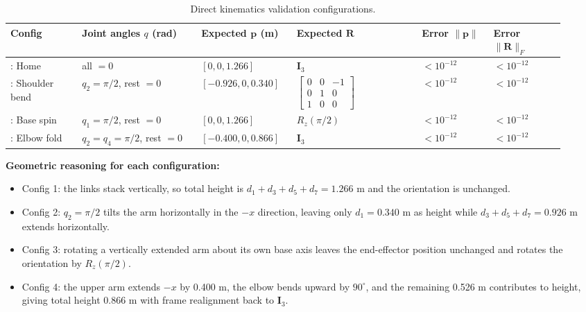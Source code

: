 \documentclass[11pt,a4paper]{article}
\newcommand{\R}{\mathbf{R}}
\newcommand{\I}{\mathbf{I}}
\newcommand{\pvec}{\mathbf{p}}
\begin{document}
\begin{table}[H]
  \centering
  \caption{Direct kinematics validation configurations.}
  \renewcommand{\arraystretch}{1.15}
  \begin{tabularx}{\linewidth}{>{\raggedright\arraybackslash}p{0.12\linewidth} >{\raggedright\arraybackslash}p{0.20\linewidth} >{\raggedright\arraybackslash}p{0.16\linewidth} >{\raggedright\arraybackslash}p{0.21\linewidth} >{\raggedright\arraybackslash}p{0.12\linewidth} >{\raggedright\arraybackslash}p{0.12\linewidth}}
    \toprule
    Config & Joint angles $q$ (rad) & Expected $\pvec$ (m) & Expected $\R$ & Error $\|\pvec\|$ & Error $\|\R\|_F$ \\
    \midrule
    1: Home & all $= 0$ & $[0, 0, 1.266]$ & $\I_3$ & $< 10^{-12}$ & $< 10^{-12}$ \\
    2: Shoulder bend & $q_2 = \pi/2$, rest $= 0$ & $[-0.926, 0, 0.340]$ & $\begin{bmatrix} 0 & 0 & -1 \\ 0 & 1 & 0 \\ 1 & 0 & 0 \end{bmatrix}$ & $< 10^{-12}$ & $< 10^{-12}$ \\
    3: Base spin & $q_1 = \pi/2$, rest $= 0$ & $[0, 0, 1.266]$ & $R_z(\pi/2)$ & $< 10^{-12}$ & $< 10^{-12}$ \\
    4: Elbow fold & $q_2 = q_4 = \pi/2$, rest $= 0$ & $[-0.400, 0, 0.866]$ & $\I_3$ & $< 10^{-12}$ & $< 10^{-12}$ \\
    \bottomrule
  \end{tabularx}
\end{table}

\noindent\textbf{Geometric reasoning for each configuration:}
\begin{itemize}
  \item Config 1: the links stack vertically, so total height is $d_1 + d_3 + d_5 + d_7 = 1.266$ m and the orientation is unchanged.
  \item Config 2: $q_2 = \pi/2$ tilts the arm horizontally in the $-x$ direction, leaving only $d_1 = 0.340$ m as height while $d_3 + d_5 + d_7 = 0.926$ m extends horizontally.
  \item Config 3: rotating a vertically extended arm about its own base axis leaves the end-effector position unchanged and rotates the orientation by $R_z(\pi/2)$.
  \item Config 4: the upper arm extends $-x$ by 0.400 m, the elbow bends upward by $90^\circ$, and the remaining 0.526 m contributes to height, giving total height 0.866 m with frame realignment back to $\I_3$.
\end{itemize}
\end{document}
